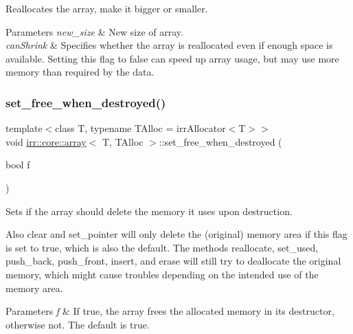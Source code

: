Reallocates the array, make it bigger or smaller. 


\begin{DoxyParams}{Parameters}
{\em new\+\_\+size} & New size of array. \\
\hline
{\em can\+Shrink} & Specifies whether the array is reallocated even if enough space is available. Setting this flag to false can speed up array usage, but may use more memory than required by the data. \\
\hline
\end{DoxyParams}
\mbox{\label{classirr_1_1core_1_1array_afddd43e25d3ad6b1a3d75ceab13e6c56}} 
\subsubsection{\texorpdfstring{set\+\_\+free\+\_\+when\+\_\+destroyed()}{set\_free\_when\_destroyed()}}
{\footnotesize\ttfamily template$<$class T, typename T\+Alloc = irr\+Allocator$<$\+T$>$$>$ \\
void \hyperlink{classirr_1_1core_1_1array}{irr\+::core\+::array}$<$ T, T\+Alloc $>$\+::set\+\_\+free\+\_\+when\+\_\+destroyed (\begin{DoxyParamCaption}\item[{bool}]{f }\end{DoxyParamCaption})\hspace{0.3cm}{\ttfamily [inline]}}



Sets if the array should delete the memory it uses upon destruction. 

Also clear and set\+\_\+pointer will only delete the (original) memory area if this flag is set to true, which is also the default. The methods reallocate, set\+\_\+used, push\+\_\+back, push\+\_\+front, insert, and erase will still try to deallocate the original memory, which might cause troubles depending on the intended use of the memory area. 
\begin{DoxyParams}{Parameters}
{\em f} & If true, the array frees the allocated memory in its destructor, otherwise not. The default is true. \\
\hline
\end{DoxyParams}
\mbox{\label{classirr_1_1core_1_1array_a75df5c46b08225d1ebe3c1381d85d9ff}} 
